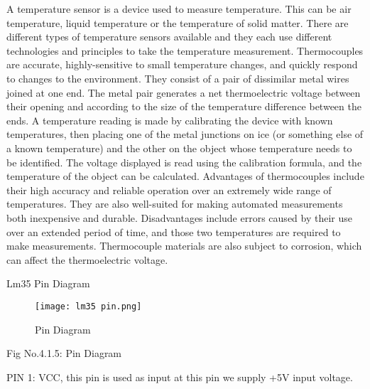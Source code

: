 \documentclass[12pt,a4paper]{report}
\begin{document}
\noindent \textbf{}

\noindent \textbf{}

\noindent \textbf{}

\noindent \textbf{}

\noindent \textbf{}

\noindent \textbf{}

\noindent \textbf{}

\noindent \textbf{}

\noindent \textbf{}

\noindent     

\noindent \textbf{}

\noindent A temperature sensor is a device used to measure temperature. This can be air temperature, liquid temperature or the temperature of solid matter. There are different types of temperature sensors available and they each use different technologies and principles to take the temperature measurement. Thermocouples are accurate, highly-sensitive to small temperature changes, and quickly respond to changes to the environment. They consist of a pair of dissimilar metal wires joined at one end. The metal pair generates a net thermoelectric voltage between their opening and according to the size of the temperature difference between the ends. A temperature reading is made by calibrating the device with known temperatures, then placing one of the metal junctions on ice (or something else of a known temperature) and the other on the object whose temperature needs to be identified. The voltage displayed is read using the calibration formula, and the temperature of the object can be calculated. Advantages of thermocouples include their high accuracy and reliable operation over an extremely wide range of temperatures. They are also well-suited for making automated measurements both inexpensive and durable. Disadvantages include errors caused by their use over an extended period of time, and those two temperatures are required to make measurements. Thermocouple materials are also subject to corrosion, which can affect the thermoelectric voltage.

\noindent 

\noindent Lm35 Pin Diagram 

\begin{figure}[htp]
    \texttt{[image: lm35 pin.png]}
    \caption{Pin Diagram }
\end{figure}

\noindent Fig No.4.1.5: Pin Diagram 

\noindent PIN 1: VCC, this pin is used as input at this pin we supply +5V input voltage.
\end{document}
